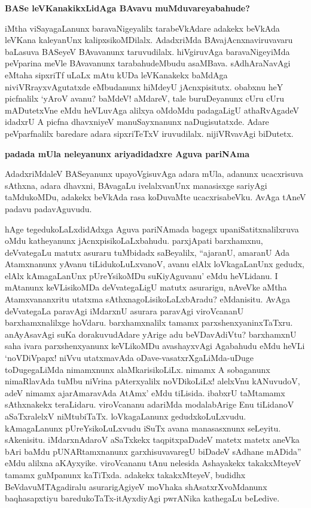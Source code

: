 {\bigskip
\noindent
{\large\bf BASe leVKanakikxLidAga BAvavu muMduvareyabahude?}}\label{page186}
\medskip

\noindent
iMtha viSayagaLanunx baravaNigeyalilx tarabeVkAdare adakekx beVkAda leVKana kaleyanUnx kalipxsikoM\-Dilalx. AdadxriMda BAvajAcnxnaviruvavaru baLasuva BASeyeV BAvavanunx taruvudilalx. hiVgiruvAga bara\-vaNigeyiMda peVparina meVle BAvavanunx tarabahudeMbudu asaMBava. sAdhAraNavAgi eMtaha sipxriTf uLaLx mAtu\- kUDa leVKanakekx baMdAga niviVRrayxvAgutatxde eMbudanunx hiMdeyU jAcnxpisitutx. obabxnu heY picfnalilx `yAroV avanu? baMdeV! aMdareV, tale buruDeyanunx cUru cUru mADutetxVne eMdu heVLuvAga alilxya oMdoMdu padagaLigU athaRvAgadeV idadxrU A picfna dhavxniyeV manuSayxnanunx naDugisutatxde. Adare peVparfnalilx baredare adara sipxriTeTxV iruvudilalx. nijiVRvavAgi biDutetx.

{\bigskip
\noindent
{\large\bf padada mUla neleyanunx ariyadidadxre Aguva pariNAma}}
\medskip

\noindent
AdadxriMdaleV BASeyanunx upayoVgisuvAga adara mUla, adanunx ucacxrisuva sAthxna, adara dhavxni, BAvagaLu ivelalxvanUnx manasisxge sariyAgi taMdukoMDu, adakekx beVkAda rasa koDuvaMte ucacxrisa\-beVku. AvAga tAneV padavu padavAguvudu.

hAge tegedukoLaLxdidAdxga Aguva pariNAmada bagegx upaniSatitxnalilxruva oMdu katheyanunx jAcnxpisi\-koLaLxbahudu. parxjApati barxhamxnu, deVvategaLu matutx asuraru tuMbidadx saBeyalilx, ``ajaranU, ama\-ranU Ada Atamxnanunx yAvanu tiLidukoLuLxvanoV, avanu elAlx loVkagaLanUnx gedudx, elAlx kAma\-gaLanUnx pUreYsikoMDu suKiyAguvanu' eMdu heVLidanu. I mAtanunx keVLisikoMDa deVvate\-gaLigU matutx asurarigu, nAveVke aMtha Atamxvananxritu utatxma sAthxnagoLisikoLaLxbAradu? eMdanisitu. AvAga\- deVvate\-gaLa paravAgi iMdarxnU asurara paravAgi viroVcananU barxhamxnalilxge hoVdaru. barxhamxnalilx tamamx parxshenxyaninxTaTxru. anAyAsavAgi suKa dorakuvudAdare yArige adu beVDavAdiVtu? barxhamxnU saha ivara parxshenxyanunx keVLikoMDu avashayxvAgi Agabahudu eMdu heVLi `noVDiVpapx! niVvu utatxma\-vAda oDave-vasatxrXgaLiMda-uDuge toDugegaLiMda nimamxnunx alaMkarisikoLiLx. nimamx A sobaganunx nimaR\-lavAda tuMbu niVrina pAterxyalilx noVDikoLiLx! alelxVnu kANuvudoV, adeV nimamx ajarAmaravAda AtAmx' eMdu tiLisida. ibabxrU taMtamamx sAthxnakekx teraLidaru. viroVcananu adariMda modalabArige Enu tiLidanoV aSaTxralelxV niMtubiTaTx. loVkagaLanunx gedudxkoLuLxvudu. kAmagaLanunx pUreYsikoLuLxvudu iSuTx avana manasasxnunx seLeyitu. sAkenisitu. iMdarxnAdaroV aSaTxkekx taqpitxpaDadeV matetx matetx aneVka bAri baMdu pUNARtamxnanunx garxhisuvavaregU biDadeV sAdhane mADida'' eMdu alilxna aKAyxyike. viroV\-cananu tAnu nelesida Ashayakekx takakxMteyeV tamamx guMpanunx kaTiTxda. adakekx takakxMteyeV, budidhx BeVda\-vuMTAgadiralu asurarigAgiyeV moVhaka shAsatxrXvoMdanunx baqhasapxtiyu baredukoTaTx-itAyxdiyAgi pwrANika kathegaLu beLedive.

